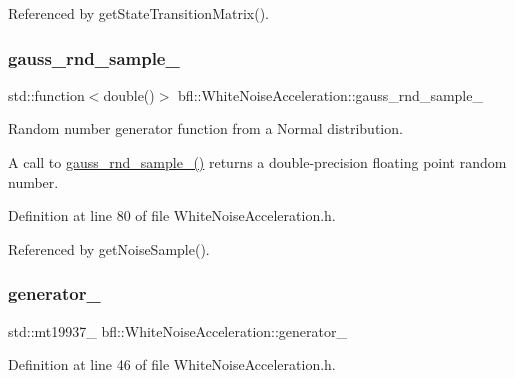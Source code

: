Referenced by get\+State\+Transition\+Matrix().

\mbox{\label{classbfl_1_1WhiteNoiseAcceleration_a6f025667b1a8fa08b3fca5d8c5d26aec}} 
\subsubsection{\texorpdfstring{gauss\+\_\+rnd\+\_\+sample\+\_\+}{gauss\_rnd\_sample\_}}
{\footnotesize\ttfamily std\+::function$<$double()$>$ bfl\+::\+White\+Noise\+Acceleration\+::gauss\+\_\+rnd\+\_\+sample\+\_\+\hspace{0.3cm}{\ttfamily [protected]}}



Random number generator function from a Normal distribution. 

A call to {\ttfamily \mbox{\hyperlink{classbfl_1_1WhiteNoiseAcceleration_a6f025667b1a8fa08b3fca5d8c5d26aec}{gauss\+\_\+rnd\+\_\+sample\+\_\+()}}} returns a double-\/precision floating point random number. 

Definition at line 80 of file White\+Noise\+Acceleration.\+h.



Referenced by get\+Noise\+Sample().

\mbox{\label{classbfl_1_1WhiteNoiseAcceleration_a53532f567190af8a0baa579e3bd4e362}} 
\subsubsection{\texorpdfstring{generator\+\_\+}{generator\_}}
{\footnotesize\ttfamily std\+::mt19937\+\_ bfl\+::\+White\+Noise\+Acceleration\+::generator\+\_\+\hspace{0.3cm}{\ttfamily [private]}}



Definition at line 46 of file White\+Noise\+Acceleration.\+h.


